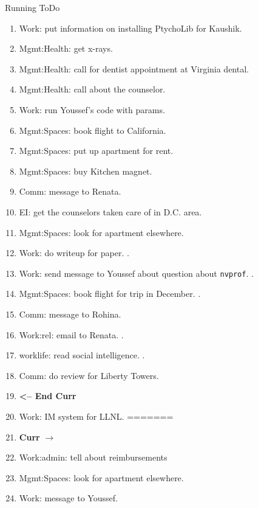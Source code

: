 \begin{columns}
\begin{column}{0.5\columnwidth}
\begin{columns}
\begin{column}{0.6\linewidth}
\begin{block}{Running ToDo}
\begin{enumerate}
     \item \tiny Work: put information on installing PtychoLib for Kaushik. 
     \item \tiny Mgmt:Health: get x-rays. 
     \item \tiny Mgmt:Health: call for dentist appointment at Virginia
       dental.
     \item \tiny Mgmt:Health: call about the counselor. 
     \item \tiny Work: run Youssef’s code with params.
     \item \tiny Mgmt:Spaces: book flight to California.
     \item \tiny Mgmt:Spaces: put up apartment for rent.
     \item \tiny Mgmt:Spaces: buy Kitchen magnet.
     \item \tiny Comm: message to Renata.
     \item \tiny EI: get the counselors taken care of in D.C. area. 
     \item \tiny Mgmt:Spaces: look for apartment elsewhere. 
     \item \tiny Work: do writeup for paper. . 
     \item \tiny Work: send message to Youssef about question about
       \texttt{nvprof}. .
     \item \tiny Mgmt:Spaces: book flight for trip in December. .
     \item \tiny Comm: message to Rohina. 
     \item \tiny Work:rel: email to Renata. . 
     \item \tiny worklife: read social intelligence. . 
     \item \tiny Comm: do review for Liberty Towers.
     \item \tiny \textbf{ <-- End Curr } 

     \item \tiny Work: IM system for LLNL.
=======



        \tiny \item \tiny \textbf{Curr} $\rightarrow$ 
        \item \tiny Work:admin: tell about reimbursements 
        \item \tiny  Mgmt:Spaces: look for apartment elsewhere. 

        \item \tiny Work: message to Youssef.   


\end{enumerate}
\end{block}
\end{column}
\end{columns}
\end{column}
\end{columns}
